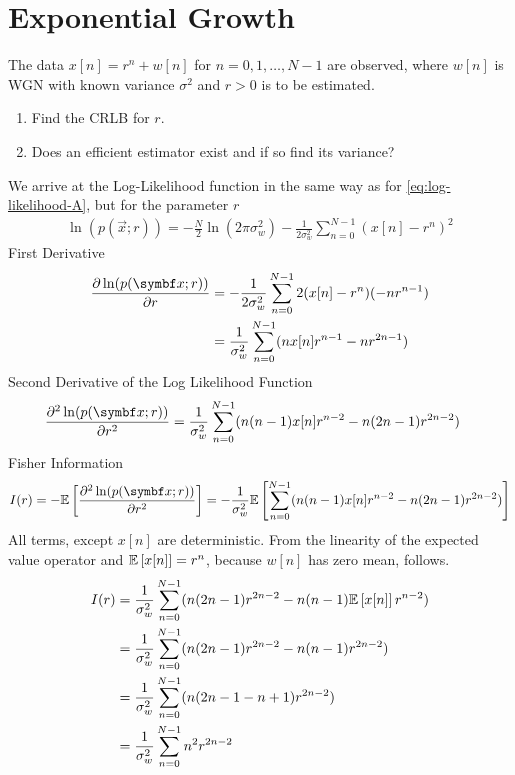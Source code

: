 \section{Exponential Growth}

\begin{note-block}
The data $x[n] = r^n + w[n]$ for $n = 0, 1, \ldots , N - 1$ are observed, where $w[n]$ is WGN with known variance $\sigma^2$ and $r > 0$ is to be estimated.
\begin{enumerate}[label={(\alph*)}]
    \item Find the CRLB for $r$.
    \item Does an efficient estimator exist and if so find its variance?
\end{enumerate}
\end{note-block}

We arrive at the Log-Likelihood function in the same way as for \autoref{eq:log-likelihood-A}, but for the parameter $r$
\begin{align}
    \ln(p(\vec{x};r)) = -\frac{N}{2}\ln(2\pi \sigma^2_w) -\frac{1}{2\sigma_w^2}\sum_{n=0}^{N-1} (x[n] - r^n)^2 \label{eq:log-likelihood-r}
\end{align}
First Derivative
\begin{align}
    \pd[\ln(p(\vec{x};r))]{r}
    &= -\frac{1}{2\sigma_w^2}\sum_{n=0}^{N-1} 2(x[n] - r^n) (-nr^{n-1})\notag \\
    &= \frac{1}{\sigma_w^2}\sum_{n=0}^{N-1} (nx[n]r^{n-1} - nr^{2n-1}) \label{eq:dL-r}
\end{align}
Second Derivative of the Log Likelihood Function
\begin{align}
    \pnd[\ln(p(\vec{x};r))]{2}{r}
    &= \frac{1}{\sigma_w^2} \sum_{n=0}^{N-1} (n(n-1)x[n]r^{n-2} - n(2n-1)r^{2n-2})
\end{align}
Fisher Information
\begin{align*}
    I(r) = -\E{\pnd[\ln(p(\vec{x};r))]{2}{r}}
    = -\frac{1}{\sigma_w^2}
    \E{\sum_{n=0}^{N-1} (n(n-1)x[n]r^{n-2} - n(2n-1)r^{2n-2})}
\end{align*}
All terms, except $x[n]$ are deterministic. From the linearity of the expected value operator and $\mathbb{E}\left[x[n]\right]=r^n$, because $w[n]$ has zero mean, follows.
\begin{align}
    I(r) 
    &= \frac{1}{\sigma_w^2} \sum_{n=0}^{N-1} (n(2n-1)r^{2n-2} - n(n-1)\mathbb{E}\left[x[n]\right]r^{n-2}) \notag \\
    &= \frac{1}{\sigma_w^2} \sum_{n=0}^{N-1} (n(2n-1)r^{2n-2} - n(n-1)r^{2n-2}) \notag \\
    &= \frac{1}{\sigma_w^2} \sum_{n=0}^{N-1} (n(2n-1-n+1)r^{2n-2}) \notag \\
    &= \frac{1}{\sigma_w^2} \sum_{n=0}^{N-1} n^2r^{2n-2} \label{eq:fisher-information-r}
\end{align}


